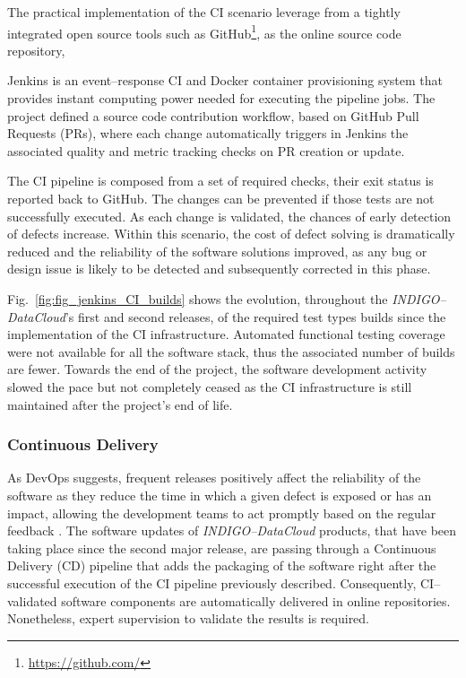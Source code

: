 \documentclass[journal]{IEEEtran}
\begin{document}
The practical implementation of the CI scenario leverage from a tightly integrated open
source tools such as GitHub\footnote{\url{https://github.com/}}, as the online source code repository,

Jenkins is an event--response CI and Docker container
provisioning system that provides instant computing power needed for executing the pipeline jobs.
The project defined a source code contribution workflow, based on GitHub Pull Requests
(PRs), where each change automatically triggers in Jenkins the associated quality and
metric tracking checks on PR creation or update.

The CI pipeline is composed from a set of required checks, their exit status
is reported back to GitHub. The changes can be prevented if those tests are
not successfully executed.
As each change is validated, the chances
of early detection of defects increase. Within this scenario, the cost of defect solving
is dramatically reduced and the reliability of the software solutions improved, as any
bug or design issue is likely to be detected and subsequently corrected in this phase.

Fig.~\ref{fig:fig_jenkins_CI_builds} shows the evolution, throughout the
{\sl INDIGO--DataCloud}'s first and second releases, of the required test types builds since the
implementation of the CI infrastructure. Automated functional testing coverage were not
available for all the software stack, thus the associated number of builds are fewer. Towards the
end of the project, the software development activity slowed the pace but not completely ceased
as the CI infrastructure is still maintained after the project's end of life.

\subsubsection{Continuous Delivery}
As DevOps suggests, frequent releases positively affect the reliability of the software as
they reduce the time in which a given defect is exposed or has an impact, allowing the 
development teams to act promptly based on the regular feedback \cite{chen2015}. The software updates of
{\sl INDIGO--DataCloud} products, that have been taking place since the second major release, are passing through
a Continuous Delivery (CD) pipeline that adds the packaging of the software right after the
successful execution of the CI pipeline previously described. Consequently, CI--validated
software components are automatically delivered in online repositories. Nonetheless,
expert supervision to validate the results is required.
\end{document}
